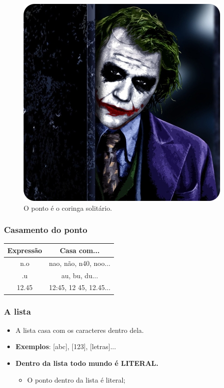 \begin{frame}
	\begin{figure}
		\centering
		\includegraphics[height=0.8\textheight]{./imagens/re/sad_joker.jpeg}
		\caption{O ponto é o coringa solitário.}
	\end{figure}
\end{frame}

\begin{frame}
	\frametitle{Casamento do ponto}
	\begin{center}
		\begin{tabular}{ c | c }
		\textbf{Expressão}	& \textbf{Casa com...}		\\ \hline
		n.o			& nao, não, n40, noo...  	\\ \hline
		.u			& au, bu, du...		 	\\ \hline
		12.45			& 12:45, 12 45, 12.45... 	\\ \hline
		\end{tabular}
	\end{center}

\end{frame}


\begin{frame}
	\frametitle{A lista}
	\begin{itemize}
		\item \Large{A lista casa com  os caracteres dentro dela.}
		\item \textbf{Exemplos}: [abc], [123], [letras]...
		\item \large{\bf Dentro da lista todo mundo é LITERAL.}
		\begin{itemize}
			\item O ponto dentro da lista é literal;
		\end{itemize}
	\end{itemize}
\end{frame}

